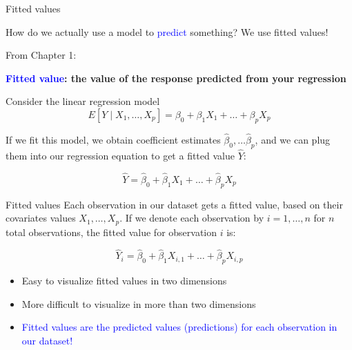 \documentclass[10pt,t]{beamer}
\begin{document}
\begin{frame}{Fitted values}
	
	\vspace{-5 mm}
	
	How do we actually use a model to  \textcolor{blue}{predict} something? We use fitted values!
	
	\vspace{0.3cm}
	
	From Chapter 1:
	
	\vspace{0.3cm}
	
	\textbf{\textcolor{blue}{Fitted value}: the value of the response predicted from your regression}
	
	\vspace{0.3cm}
	
	Consider the linear regression model
	$$
	E[Y \mid X_1, \dots, X_p] = \beta_0 + \beta_1 X_1 + \dots + \beta_p X_p
	$$
	\smallskip
	
	If we fit this model, we obtain coefficient estimates $\hat{\beta}_0, \dots \hat{\beta}_p$, and we can plug them into our regression equation to get a fitted value $\hat{Y}$:
	
	\medskip
	$$
	\hat{Y} = \hat{\beta}_0 + \hat{\beta}_1 X_1 + \dots + \hat{\beta}_p X_p
	$$
	
	
\end{frame}

\begin{frame}{Fitted values}
Each observation in our dataset gets a fitted value, based on their covariates values $X_1, \dots, X_p$. If we denote each observation by $i = 1, \dots, n$ for $n$ total observations, the fitted value for observation $i$ is:
\medskip

$$
\hat{Y}_i = \hat{\beta}_0 + \hat{\beta}_1 X_{i, 1} + \dots + \hat{\beta}_p X_{i, p}
$$

\medskip

\begin{itemize}
\item Easy to visualize fitted values in two dimensions
\medskip

\item More difficult to visualize in more than two dimensions
\medskip

\item \textcolor{blue}{Fitted values  are the predicted values (predictions) for each observation in our dataset!}
\end{itemize}
\end{frame}
\end{document}

